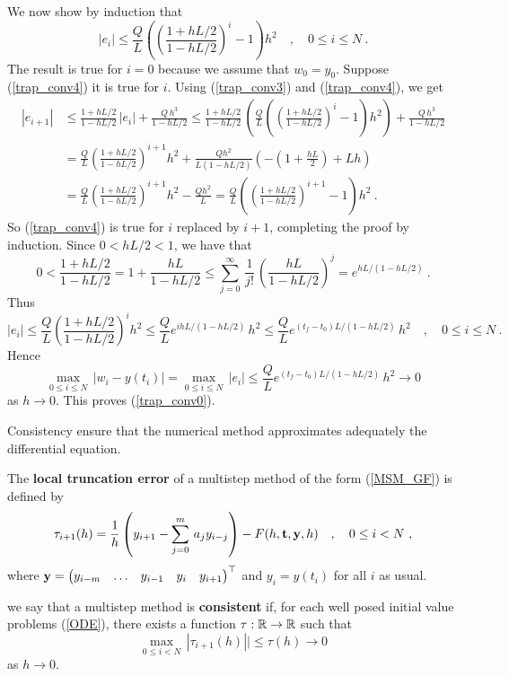 \begin{rmk}
We now show by induction that
\begin{equation} \label{trap_conv4}
|e_i|  \leq \frac{Q}{L}\left( \left(
\frac{1+ hL/2}{1-hL/2} \right)^i -1 \right)h^2
\quad , \quad 0 \leq i \leq N \ .
\end{equation}
The result is true for $i=0$ because we assume that
$w_0 = y_0$.  Suppose (\ref{trap_conv4}) it is true
for $i$.  Using (\ref{trap_conv3}) and (\ref{trap_conv4}), we get
\begin{align*}
|e_{i+1}| &\leq \frac{1+ hL/2}{1-hL/2}\,|e_i|
+\frac{Q\,h^3}{1- hL/2} \leq \frac{1+ hL/2}{1- hL/2}\,
\left(\frac{Q}{L}\left(\left( \frac{1+ hL/2}{1- hL/2}\right)^i
 -1 \right)h^2\right) +\frac{Q\,h^3}{1-hL/2} \\
&= \frac{Q}{L}\left(\frac{1+ hL/2}{1- hL/2}\right)^{i+1}
h^2 + \frac{Q h^2}{L(1- hL/2)}
\left(-\left(1+ \frac{hL}{2}\right)+L h\right) \\
&= \frac{Q}{L}\left(\frac{1+ hL/2}{1- hL/2}\right)^{i+1}
h^2 - \frac{Q h^2}{L}
= \frac{Q}{L}\left( \left(\frac{1+hL/2}{1-hL/2}\right)^{i+1} -1 \right) h^2
\ .
\end{align*}
So (\ref{trap_conv4}) is true for $i$ replaced by $i+1$, completing
the proof by induction.  Since $0 < hL/2 < 1$, we have that
\[
0 < \frac{1+hL/2}{1-hL/2} =
1 + \frac{hL}{1- hL/2} \leq
\sum_{j=0}^\infty\, \frac{1}{j!}\,
\left( \frac{hL}{1 - hL/2} \right)^j =
e^{hL/(1-hL/2)} \ .
\]
Thus
\[
|e_i| \leq \frac{Q}{L}
\left(\frac{1+hL/2}{1 - hL/2}\right)^i
h^2 \leq \frac{Q}{L} e^{ihL/(1-hL/2)}\,h^2
\leq \frac{Q}{L} e^{(t_f-t_0)L/(1-hL/2)}\,h^2
\quad, \quad 0 \leq i \leq N \ .
\]
Hence
\[
\max_{0\leq i \leq N}\,|w_i-y(t_i)| = \max_{0\leq i \leq N}\,|e_i|
\leq \frac{Q}{L} e^{(t_f-t_0)L/(1-hL/2)}\,h^2 \to 0
\]
as $h \rightarrow 0$.  This proves (\ref{trap_conv0}).
\label{ConvAltern}
\end{rmk}

Consistency ensure that the numerical method approximates adequately
the differential equation.

\begin{defn}
The {\bfseries local truncation error} of
a multistep method of the form (\ref{MSM_GF}) is defined by
\[
\tau_{i+1}(h) = \frac{1}{h} \left( y_{i+1} - \sum_{j=0}^m\,a_j y_{i-j} \right)
- F(h,\mathbf{t},\mathbf{y}, h) \quad , \quad 0 \leq i < N \ ,
\]
where
$\mathbf{y} = \begin{pmatrix} y_{i-m} & \ldots & y_{i-1} & y_i & y_{i+1}
\end{pmatrix}^\top$ and $y_i = y(t_i)$ for all $i$ as usual.

we say that a multistep method is
{\bfseries consistent} if, for each
well posed initial value problems (\ref{ODE}), there exists a function
$\tau:\mathbb{R}\to \mathbb{R}$ such that
\[
\max_{0 \leq i < N} \, |\tau_{i+1}(h)| | \leq \tau(h) \to 0
\]
as $h\to 0$.  \label{methodCons}
\end{defn}

